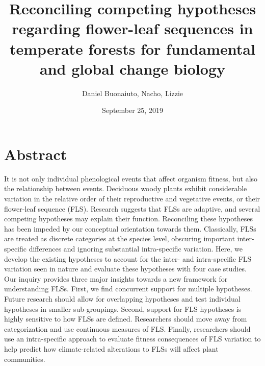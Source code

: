 \documentclass[12pt]{article}\usepackage[]{graphicx}\usepackage[]{color}
\title{Reconciling competing hypotheses regarding flower-leaf sequences in temperate forests for fundamental and global change biology}
\author{Daniel Buonaiuto, Nacho, Lizzie}
\date{September 25, 2019}
\begin{document}
\maketitle

\begin{enumerate}
\end{enumerate}
\section*{Abstract}
\indent\indent It is not only individual phenological events that affect organism fitness, but also the relationship between events. Deciduous woody plants exhibit considerable variation in the relative order of their reproductive and vegetative events, or their flower-leaf sequence (FLS). Research suggests that FLSs are adaptive, and several competing hypotheses may explain their function. Reconciling these hypotheses has been impeded by our conceptual orientation towards them. Classically, FLSs are treated as discrete categories at the species level, obscuring important inter-specific differences and ignoring substantial intra-specific variation. Here, we develop the existing hypotheses to account for the inter- and intra-specific FLS variation seen in nature and evaluate these hypotheses with four case studies. Our inquiry provides three major insights towards a new framework for understanding FLSs. First, we find concurrent support for multiple hypotheses. Future research should allow for overlapping hypotheses and test individual hypotheses in smaller sub-groupings. Second, support for FLS hypotheses is highly sensitive to how FLSs are defined. Researchers should move away from categorization and use continuous measures of FLS. Finally, researchers should use an intra-specific approach to evaluate fitness consequences of FLS variation to help predict how climate-related alterations to FLSs will affect plant communities.\\


\end{document}
